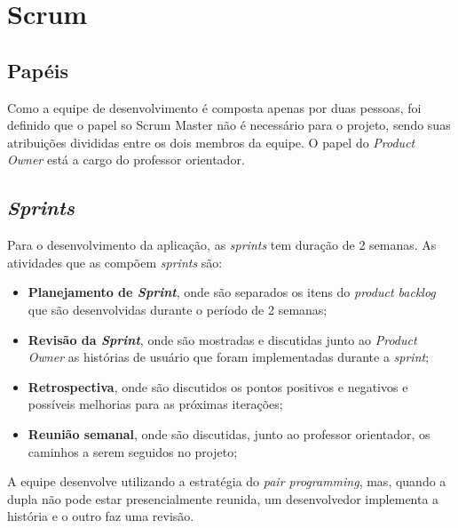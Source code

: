 \section{Scrum}

\subsection{Papéis}
Como a equipe de desenvolvimento é composta apenas por duas pessoas, foi definido que o papel so Scrum Master não é necessário para o projeto, sendo suas atribuições divididas entre os dois membros da equipe. O papel do \textit{Product Owner} está a cargo do professor orientador.

\subsection{\textit{Sprints}}
Para o desenvolvimento da aplicação, as \textit{sprints} tem duração de 2 semanas. As atividades que as compõem \textit{sprints} são: 
\begin{itemize}
  \item \textbf{Planejamento de \textit{Sprint}}, onde são separados os itens do \textit{product backlog} que são desenvolvidas durante o período de 2 semanas;
  \item \textbf{Revisão da \textit{Sprint}}, onde são mostradas e discutidas junto ao \textit{Product Owner} as histórias de usuário que foram implementadas durante a \textit{sprint};
  \item \textbf{Retrospectiva}, onde são discutidos os pontos positivos e negativos e possíveis melhorias para as próximas iterações;
  \item \textbf{Reunião semanal}, onde são discutidas, junto ao professor orientador, os caminhos a serem seguidos no projeto;
\end{itemize}
A equipe desenvolve utilizando a estratégia do \textit{pair programming}, mas, quando a dupla não pode estar presencialmente reunida, um desenvolvedor implementa a história e o outro faz uma revisão.
